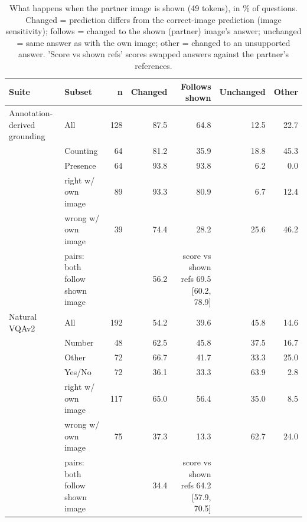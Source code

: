 \begin{table}[t]
\centering
\small
\caption{What happens when the partner image is shown (49 tokens), in \% of questions. Changed = prediction differs from the correct-image prediction (image sensitivity); follows = changed to the shown (partner) image's answer; unchanged = same answer as with the own image; other = changed to an unsupported answer. 'Score vs shown refs' scores swapped answers against the partner's references.}
\label{tab:t2_t4_swap_decomposition_compress49}
\begin{tabular}{llrrrrr}
\toprule
Suite & Subset & n & Changed & Follows shown & Unchanged & Other \\
\midrule
Annotation-derived grounding & All & 128 & 87.5 & 64.8 & 12.5 & 22.7 \\
 & Counting & 64 & 81.2 & 35.9 & 18.8 & 45.3 \\
 & Presence & 64 & 93.8 & 93.8 & 6.2 & 0.0 \\
 & right w/ own image & 89 & 93.3 & 80.9 & 6.7 & 12.4 \\
 & wrong w/ own image & 39 & 74.4 & 28.2 & 25.6 & 46.2 \\
 & pairs: both follow shown image &  & 56.2 & score vs shown refs 69.5 [60.2, 78.9] &  &  \\
Natural VQAv2 & All & 192 & 54.2 & 39.6 & 45.8 & 14.6 \\
 & Number & 48 & 62.5 & 45.8 & 37.5 & 16.7 \\
 & Other & 72 & 66.7 & 41.7 & 33.3 & 25.0 \\
 & Yes/No & 72 & 36.1 & 33.3 & 63.9 & 2.8 \\
 & right w/ own image & 117 & 65.0 & 56.4 & 35.0 & 8.5 \\
 & wrong w/ own image & 75 & 37.3 & 13.3 & 62.7 & 24.0 \\
 & pairs: both follow shown image &  & 34.4 & score vs shown refs 64.2 [57.9, 70.5] &  &  \\
\bottomrule
\end{tabular}
\end{table}
